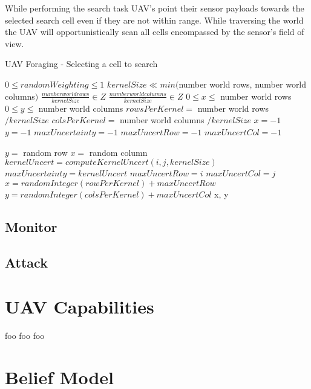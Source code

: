 While performing the search task UAV's point their sensor payloads towards the selected search cell even if they are not within range.  While traversing the world the UAV will opportunistically scan all cells encompassed by the sensor's field of view.

\begin{algorithm}
	\caption{UAV Foraging - Selecting a cell to search}
	\label{alg:forage}
	\begin{algorithmic}[1]
		\REQUIRE $ 0\le randomWeighting \le 1$
		\REQUIRE $ kernelSize \ll min($number world rows, number world columns$)$
		\REQUIRE $ \frac{number world rows}{kernelSize} \in Z$
		\REQUIRE $ \frac{number world columns}{kernelSize} \in Z$
		\ENSURE $ 0 \le x \le $ number world rows
		\ENSURE $ 0 \le y \le $ number world columns
		\STATE $rowsPerKernel = $ number world rows $ / kernelSize$
		\STATE $colsPerKernel = $ number world columns $ / kernelSize$		
		\STATE $x = -1$
		\STATE $y = -1$
		\STATE $maxUncertainty = -1$
		\STATE $maxUncertRow = -1$
		\STATE $maxUncertCol = -1$


			\STATE $ y = $ random row
			\STATE $ x = $ random column
		\ELSE
					\STATE $kernelUncert = computeKernelUncert(i,j, kernelSize)$
						\STATE $maxUncertainty = kernelUncert$
						\STATE $maxUncertRow = i$
						\STATE $maxUncertCol = j$	
					\ENDIF
				\ENDFOR
			\ENDFOR
			\STATE $x = randomInteger(rowPerKernel) + maxUncertRow$			
			\STATE $y = randomInteger(colsPerKernel) + maxUncertCol$
		\ENDIF
		\RETURN x, y
	\end{algorithmic}
\end{algorithm}

\subsection{Monitor}
\subsection{Attack}

\section{UAV Capabilities}
foo foo foo

\section{Belief Model}
\label{sec:uavBelief}



